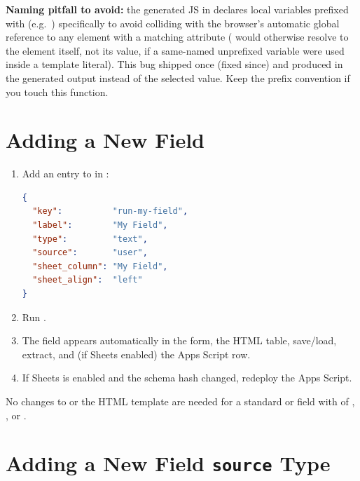\begin{warningbox}
\textbf{Naming pitfall to avoid:} the generated JS in
 declares local variables prefixed with
\code{\_} (e.g.\ ) specifically to avoid
colliding with the browser's automatic global reference to any element with
a matching  attribute ( would otherwise
resolve to the  element itself, not its value, if a
same-named unprefixed variable were used inside a template literal). This bug
shipped once (fixed since) and produced  in
the generated output instead of the selected value. Keep the \code{\_} prefix
convention if you touch this function.
\end{warningbox}

\chapter{Adding a New Field}

\begin{enumerate}
    \item Add an entry to  in :
\begin{lstlisting}[language=JSON]
{
  "key":          "run-my-field",
  "label":        "My Field",
  "type":         "text",
  "source":       "user",
  "sheet_column": "My Field",
  "sheet_align":  "left"
}
\end{lstlisting}
    \item Run .
    \item The field appears automatically in the form, the HTML table,
          save/load, extract, and (if Sheets enabled) the Apps Script row.
    \item If Sheets is enabled and the schema hash changed, redeploy the
          Apps Script.
\end{enumerate}

No changes to  or the HTML template are needed for a standard
 or  field with  of ,
, or .

\chapter{Adding a New Field \texttt{source} Type}

